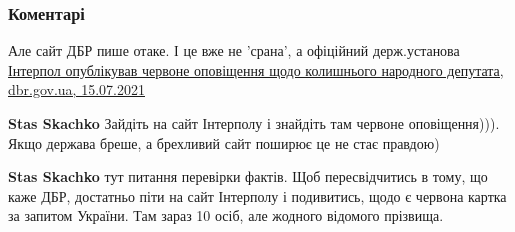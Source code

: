  
 
 
 
 
\subsubsection{Коментарі}

\begin{itemize}
 
Але сайт ДБР пише отаке. І це вже не 'срана', а офіційний держ.установа
\href{https://dbr.gov.ua/news/kolishnogo-narodnogo-deputata-ogolosheno-v-mizhnarodnij-rozshuk}{%
Інтерпол опублікував червоне оповіщення щодо колишнього народного депутата, dbr.gov.ua, 15.07.2021%
}

\begin{itemize}
 
\textbf{Stas Skachko} Зайдіть на сайт Інтерполу і знайдіть там червоне оповіщення))). Якщо держава бреше, а брехливий сайт поширює це не стає правдою)

 
\textbf{Stas Skachko} тут питання перевірки фактів. Щоб пересвідчитись в тому, що каже ДБР, достатньо піти на сайт Інтерполу і подивитись, щодо є червона картка за запитом України. Там зараз 10 осіб, але жодного відомого прізвища.

 

\end{itemize}
\end{itemize}

